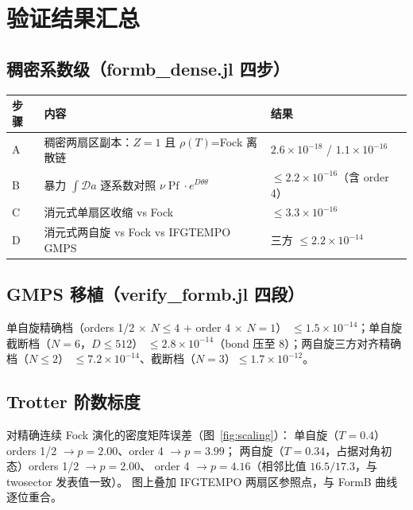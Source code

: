 \documentclass[11pt,a4paper]{ctexart}
\newcommand{\Pf}{\operatorname{Pf}}
\newcommand{\Deff}{D}             %
\begin{document}
\section{验证结果汇总}
\label{sec:verify}

\subsection{稠密系数级（formb\_dense.jl 四步）}

\begin{center}
\begin{tabular}{lll}
\toprule
步骤 & 内容 & 结果 \\
\midrule
A & 稠密两扇区副本：$Z{=}1$ 且 $\rho(T)$=Fock 离散链 & $2.6\times10^{-18}$ / $1.1\times10^{-16}$ \\
B & 暴力 $\int\mathcal Da$ 逐系数对照 $\nu\Pf\cdot e^{\Deff\theta\theta}$ & $\le2.2\times10^{-16}$（含 order 4） \\
C & 消元式单扇区收缩 vs Fock & $\le3.3\times10^{-16}$ \\
D & 消元式两自旋 vs Fock vs IFGTEMPO GMPS & 三方 $\le2.2\times10^{-14}$ \\
\bottomrule
\end{tabular}
\end{center}

\subsection{GMPS 移植（verify\_formb.jl 四段）}

单自旋精确档（orders 1/2 $\times$ $N{\le}4$ + order 4 $\times$ $N{=}1$）
$\le1.5\times10^{-14}$；单自旋截断档（$N{=}6$，$D{\le}512$）
$\le2.8\times10^{-14}$（bond 压至 8）；两自旋三方对齐精确档（$N{\le}2$）
$\le7.2\times10^{-14}$、截断档（$N{=}3$）$\le1.7\times10^{-12}$。

\subsection{Trotter 阶数标度}

对精确连续 Fock 演化的密度矩阵误差（图~\ref{fig:scaling}）：
单自旋（$T{=}0.4$）orders 1/2 $\to p=2.00$、order 4 $\to p=3.99$；
两自旋（$T{=}0.34$，占据对角初态）orders 1/2 $\to p=2.00$、
order 4 $\to p=4.16$（相邻比值 $16.5/17.3$，与 twosector 发表值一致）。
图上叠加 IFGTEMPO 两扇区参照点，与 FormB 曲线逐位重合。
\end{document}
